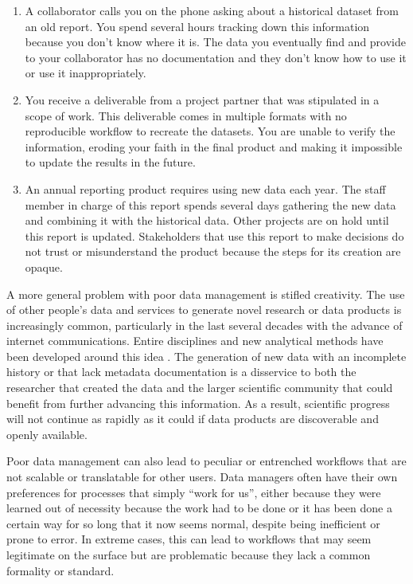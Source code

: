 \documentclass[
]{book}
\providecommand{\tightlist}{%
  \setlength{\itemsep}{0pt}\setlength{\parskip}{0pt}}
\begin{document}
\begin{enumerate}
\def\labelenumi{\arabic{enumi})}
\tightlist
\item
  A collaborator calls you on the phone asking about a historical dataset from an old report. You spend several hours tracking down this information because you don't know where it is. The data you eventually find and provide to your collaborator has no documentation and they don't know how to use it or use it inappropriately.
\item
  You receive a deliverable from a project partner that was stipulated in a scope of work. This deliverable comes in multiple formats with no reproducible workflow to recreate the datasets. You are unable to verify the information, eroding your faith in the final product and making it impossible to update the results in the future.
\item
  An annual reporting product requires using new data each year. The staff member in charge of this report spends several days gathering the new data and combining it with the historical data. Other projects are on hold until this report is updated. Stakeholders that use this report to make decisions do not trust or misunderstand the product because the steps for its creation are opaque.
\end{enumerate}

A more general problem with poor data management is stifled creativity. The use of other people's data and services \citep[i.e., ``OPEDAS'';][]{Mons18} to generate novel research or data products is increasingly common, particularly in the last several decades with the advance of internet communications. Entire disciplines and new analytical methods have been developed around this idea \citep[e.g., meta-analysis;][]{Carpenter09, Lortie14}. The generation of new data with an incomplete history or that lack metadata documentation is a disservice to both the researcher that created the data and the larger scientific community that could benefit from further advancing this information. As a result, scientific progress will not continue as rapidly as it could if data products are discoverable and openly available.

Poor data management can also lead to peculiar or entrenched workflows that are not scalable or translatable for other users. Data managers often have their own preferences for processes that simply ``work for us'', either because they were learned out of necessity because the work had to be done or it has been done a certain way for so long that it now seems normal, despite being inefficient or prone to error. In extreme cases, this can lead to workflows that may seem legitimate on the surface but are problematic because they lack a common formality or standard.
\end{document}
